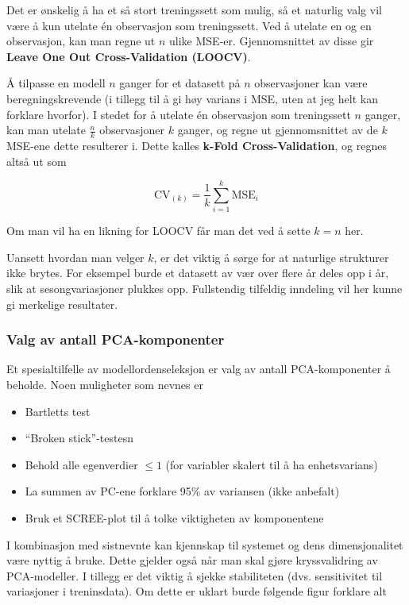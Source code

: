 Det er ønskelig å ha et så stort treningssett som mulig, så et naturlig valg vil være å kun utelate én observasjon som treningssett. Ved å utelate en og en observasjon, kan man regne ut $n$ ulike MSE-er. Gjennomsnittet av disse gir \textbf{Leave One Out Cross-Validation (LOOCV)}.

Å tilpasse en modell $n$ ganger for et datasett på $n$ observasjoner kan være beregningskrevende (i tillegg til å gi høy varians i MSE, uten at jeg helt kan forklare hvorfor). I stedet for å utelate én observasjon som treningssett $n$ ganger, kan man utelate $\frac{n}{k}$ observasjoner $k$ ganger, og regne ut gjennomsnittet av de $k$ MSE-ene dette resulterer i. Dette kalles \textbf{k-Fold Cross-Validation}, og regnes altså ut som

\begin{equation}
	\textrm{CV}_{(k)} = \frac{1}{k} \sum_{i=1}^{k} \textrm{MSE}_i
\end{equation}

Om man vil ha en likning for LOOCV får man det ved å sette $k = n$ her.

Uansett hvordan man velger $k$, er det viktig å sørge for at naturlige strukturer ikke brytes. For eksempel burde et datasett av vær over flere år deles opp i år, slik at sesongvariasjoner plukkes opp. Fullstendig tilfeldig inndeling vil her kunne gi merkelige resultater.

\subsubsection{Valg av antall PCA-komponenter}
Et spesialtilfelle av modellordenseleksjon er valg av antall PCA-komponenter å beholde. Noen muligheter som nevnes er
\begin{itemize}
	\item Bartletts test
	\item ``Broken stick''-testesn
	\item Behold alle egenverdier $\leq 1$ (for variabler skalert til å ha enhetsvarians)
	\item La summen av PC-ene forklare 95\% av variansen (ikke anbefalt)
	\item Bruk et SCREE-plot til å tolke viktigheten av komponentene
\end{itemize}
I kombinasjon med sistnevnte kan kjennskap til systemet og dens dimensjonalitet være nyttig å bruke. Dette gjelder også når man skal gjøre kryssvalidring av PCA-modeller. I tillegg er det viktig å sjekke stabiliteten (dvs. sensitivitet til variasjoner i treninsdata). Om dette er uklart burde følgende figur forklare alt

